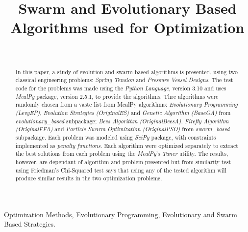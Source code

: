 \documentclass[conference]{IEEEtran}
\begin{document}
\title{Swarm and Evolutionary Based Algorithms used for Optimization}
\author{
	\\
}

\maketitle


\begin{abstract}
    In this paper, a study of evolution and swarm based algorithms is presented,
    using two classical engineering problems: \textit{Spring Tension} and \textit{Pressure Vessel
    Designs}. The test code for the problems was made using the \textit{Python Language},
    version 3.10 and uses \textit{MealPy} package, version 2.5.1,  to provide the algorithms.
    Thre algorithms were randomly chosen from a vaste list from MealPy algorithms:
    \textit{Evolutionary Programming (LevyEP)}, \textit{Evolution Strategies (OriginalES)} and
    \textit{Genetic Algorithm (BaseGA)} from \textit{evolutionary\_based} subpackage;
    \textit{Bees Algorithm (OriginalBeesA)}, \textit{Firefly Algorithm (OriginalFFA)} and
    \textit{Particle Swarm Optimization (OriginalPSO)} from \textit{swarm\_based} subpackage.
    Each problem was modeled using \textit{SciPy} package, with constraints implemented as
    \textit{penalty functions}. Each algorithm were optimized separately to extract the best
    solutions from each problem using the \textit{MealPy}'s \textit{Tuner} utility.
    The results, however, are dependant of algorithm and problem presented but from
    similarity test using Friedman's Chi-Squared test says that using any of the tested algorithm
    will produce similar results in the two optimization problems.
\end{abstract}

\begin{IEEEkeywords}
	Optimization Methods, Evolutionary Programming, Evolutionary and Swarm Based Strategies.
\end{IEEEkeywords}
\end{document}
